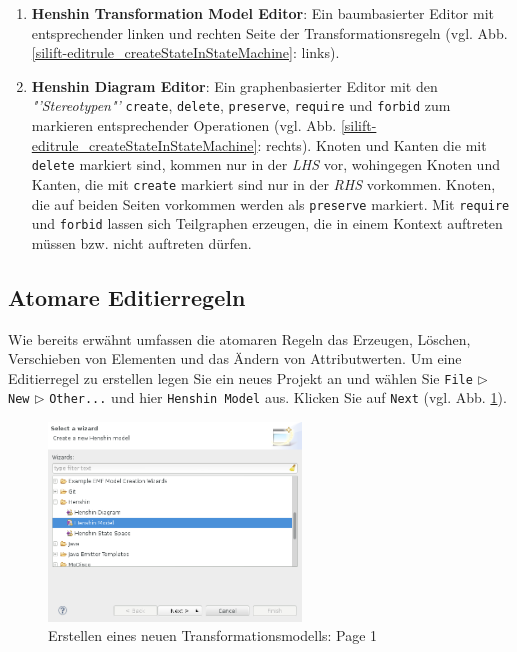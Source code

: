 \documentclass[a4paper]{scrartcl}
\begin{document}
\begin{enumerate}

\item \textbf{Henshin Transformation Model Editor}: 
Ein baumbasierter Editor mit ent\-sprech\-en\-der linken und rechten Seite der Transformationsregeln (vgl. Abb.\ref{silift-editrule_createStateInStateMachine}: links).

\item \textbf{Henshin Diagram Editor}: 
Ein graphenbasierter Editor mit den \textit{"'Stereotypen"'} \texttt{create}, \texttt{delete}, \texttt{preserve}, \texttt{require} und \texttt{forbid} zum markieren entsprechender Operationen (vgl. Abb. \ref{silift-editrule_createStateInStateMachine}: rechts).
Knoten und Kanten die mit \texttt{delete} markiert sind, kommen nur in der \textit{LHS} vor, wohingegen Knoten und Kanten, die mit \texttt{create} markiert sind nur in der \textit{RHS} vorkommen.
Knoten, die auf beiden Seiten vorkommen werden als \texttt{preserve} markiert.
Mit \texttt{require} und \texttt{forbid} lassen sich Teilgraphen erzeugen, die in einem Kontext auftreten müssen bzw. nicht auftreten dürfen.
\end{enumerate}


\subsection{Atomare Editierregeln}

Wie bereits erwähnt umfassen die atomaren Regeln das Erzeugen, Löschen, Verschieben von Elementen und das Ändern von Attributwerten.
Um eine Editierregel zu erstellen legen Sie ein neues Projekt an und wählen Sie \texttt{File} $\triangleright$ \texttt{New} $\triangleright$ \texttt{Other...} und hier \texttt{Henshin Model} aus. 
Klicken Sie auf \texttt{Next} (vgl. Abb. \ref{silift-create_henshin_model_page01}).\\


\begin{figure}[H]
\centering
\includegraphics[width=0.6\textwidth]{graphics/silift-create_henshin_model_page01.png}
\caption{Erstellen eines neuen Transformationsmodells: Page 1}
\label{silift-create_henshin_model_page01}
\end{figure}
\end{document}

